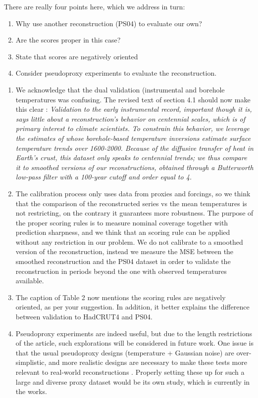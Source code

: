 \documentclass[11pt]{article}
\begin{document}
\begin{itemize}
There are really four points here, which we address in turn:
\begin{enumerate}
\item Why use another reconstruction (PS04) to evaluate our own? 
\item Are the scores proper in this case? 
\item State that scores are negatively oriented
\item Consider pseudoproxy experiments to evaluate the reconstruction. 
\end{enumerate}
\begin{enumerate}
    \item  We acknowledge that the dual validation (instrumental and borehole temperatures was confusing. The revised text of section 4.1 should now make this clear : {\it Validation to the early instrumental record, important though it is, says little about a reconstruction's behavior on centennial scales, which is of primary interest to climate scientists. To constrain this behavior, we leverage the estimates of \citet[hereafter, PS04]{Pollack2004} whose borehole-based
temperature inversions estimate surface temperature trends over 1600-2000. Because of the diffusive transfer of heat in Earth's crust, this dataset only speaks to centennial trends; we thus compare it to smoothed versions of our reconstructions, obtained through a Butterworth low-pass filter with a 100-year cutoff and order equal to 4.} 
\item  The
calibration process only uses data from proxies and forcings, so we think that
the comparison of the reconstructed series vs the mean temperatures is not
restricting, on the contrary it guarantees more robustness. The purpose of the
proper scoring rules is to measure nominal coverage together with prediction
sharpness, and we think that an scoring rule can be applied without any
restriction in our problem. We do not calibrate to a smoothed version of the
reconstruction, instead we measure the MSE between the smoothed reconstruction
and the PS04 dataset in order to validate the reconstruction in periods beyond
the one with observed temperatures available. 

\item The caption of Table 2 now mentions the scoring rules
are negatively oriented, as per your suggestion. In addition, it better explains the difference between validation to HadCRUT4 and PS04. 

\item Pseudoproxy experiments are indeed useful, but due to the length restrictions of the article, such explorations will be considered in future work. One issue is that the usual pseudoproxy designs (temperature + Gaussian noise) are over-simplistic, and more realistic designs are necessary to make these tests more relevant to real-world reconstructions \citep{Evans_grl2014}. Properly setting these up for such a large and diverse proxy dataset would be its own study, which is currently in the works. 


\end{enumerate}
\end{itemize}
\end{document}

